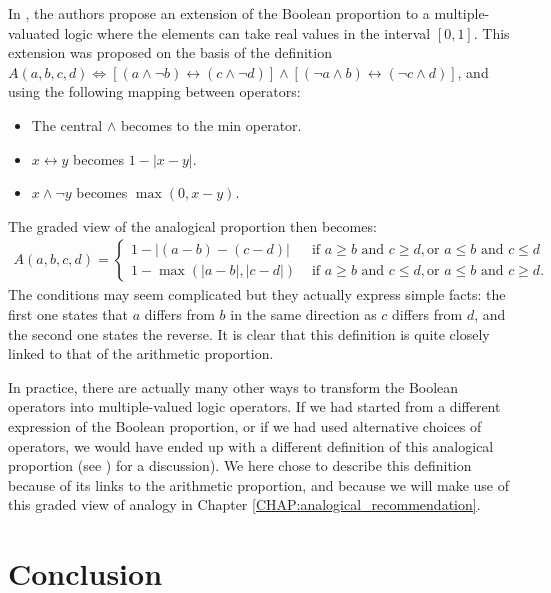 In \cite{PraRic13}, the authors propose an extension of the Boolean proportion
to a multiple-valuated logic where the elements can take real values in the
interval $[0, 1]$.  This extension was proposed on the basis of the definition
$A(a, b, c, d) \iff \left[(a \wedge \neg b) \leftrightarrow (c \wedge \neg
d)\right]  \wedge \left[(\neg a \wedge b)\leftrightarrow (\neg c \wedge
d)\right]$, and using the following mapping between operators:
\begin{itemize}
  \item The central $\wedge$ becomes to the min operator.
  \item $x \leftrightarrow y$ becomes $1 - |x - y|$.
  \item $x \wedge \neg y$ becomes $\max(0, x-y)$.
\end{itemize}
The graded view of the analogical proportion then becomes:
\begin{align*}
A(a, b, c, d) =
\begin{cases}
  1 - |(a - b) - (c - d)| &\text{ if } a \geq b \text { and } c \geq d, \text{
    or } a \leq b \text{ and } c \leq d\\
  1 - \max(|a - b|, |c - d|) &\text{ if } a \geq b \text { and } c \leq d, \text{
    or } a \leq b \text{ and } c \geq d.
\end{cases}
\end{align*}
The conditions may seem complicated but they actually express simple facts: the
first one states that $a$ differs from $b$ in the same direction as $c$ differs
from $d$, and the second one states the reverse. It is clear that this
definition is quite closely linked to that of the arithmetic proportion.

In practice, there are actually many other ways to transform the Boolean
operators into multiple-valued logic operators. If we had started from a
different expression of the Boolean proportion, or if we had used alternative
choices of operators, we would have ended up with a different definition of
this analogical proportion (see \cite{PraRic13}) for a discussion).  We here
chose to describe this definition because of its links to the arithmetic
proportion, and because  we will make use of this graded view of analogy in
Chapter \ref{CHAP:analogical_recommendation}.

\section*{Conclusion}

